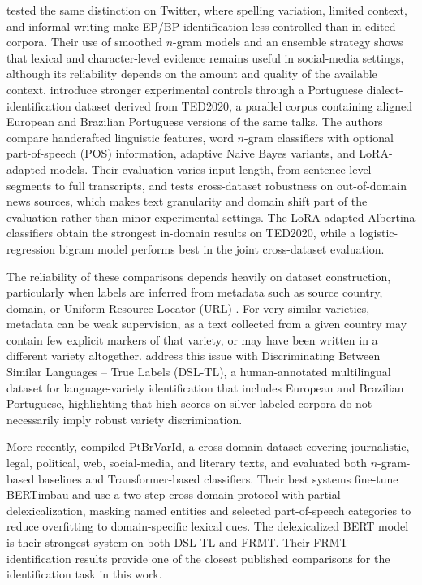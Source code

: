 \citet{7839597} tested the same distinction on Twitter, where spelling
variation, limited context, and informal writing make EP/BP identification less
controlled than in edited corpora. Their use of smoothed \(n\)-gram models and
an ensemble strategy shows that lexical and character-level evidence remains
useful in social-media settings, although its reliability depends on the amount
and quality of the available context. \citet{preda-etal-2024-across} introduce
stronger experimental controls through a Portuguese dialect-identification
dataset derived from TED2020, a parallel corpus containing aligned European and
Brazilian Portuguese versions of the same talks. The authors compare handcrafted
linguistic features, word \(n\)-gram classifiers with optional part-of-speech
(POS) information, adaptive Naive Bayes variants, and LoRA-adapted models. Their
evaluation varies input length, from sentence-level segments to full
transcripts, and tests cross-dataset robustness on out-of-domain news sources,
which makes text granularity and domain shift part of the evaluation rather
than minor experimental settings. The LoRA-adapted Albertina classifiers obtain
the strongest in-domain results on TED2020, while a logistic-regression bigram
model performs best in the joint cross-dataset evaluation.

The reliability of these comparisons depends heavily on dataset construction,
particularly when labels are inferred from metadata such as source country,
domain, or Uniform Resource Locator (URL) \citep{zampieri-etal-2014-report}. For very similar varieties,
metadata can be weak supervision, as a text collected from a given country may
contain few explicit markers of that variety, or may have been written in a
different variety altogether. \citet{zampieri-etal-2024-language} address this
issue with Discriminating Between Similar Languages -- True Labels (DSL-TL), a human-annotated multilingual dataset for language-variety
identification that includes European and Brazilian Portuguese, highlighting that high scores on silver-labeled corpora do not necessarily
imply robust variety discrimination.

More recently, \citet{sousa2025enhancingportuguesevarietyidentification}
compiled PtBrVarId, a cross-domain dataset covering journalistic, legal,
political, web, social-media, and literary texts, and evaluated both
\(n\)-gram-based baselines and Transformer-based classifiers. Their best
systems fine-tune BERTimbau \citep{souza2020bertimbau} and use a two-step
cross-domain protocol with partial delexicalization, masking named entities
and selected part-of-speech categories to reduce overfitting to domain-specific
lexical cues. The delexicalized BERT model is their strongest system on both DSL-TL and FRMT.
Their FRMT identification results provide one of the closest published
comparisons for the identification task in this work.

